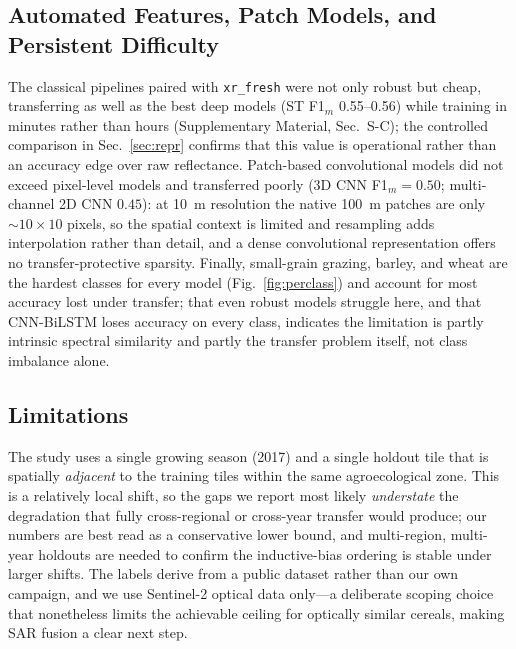 \documentclass[journal]{IEEEtran}
\begin{document}
\subsection{Automated Features, Patch Models, and Persistent Difficulty}
The classical pipelines paired with \texttt{xr\_fresh} were not only robust but cheap, transferring as well as the best deep models (ST F1$_m$ 0.55--0.56) while training in minutes rather than hours (Supplementary Material, Sec.~S-C); the controlled comparison in Sec.~\ref{sec:repr} confirms that this value is operational rather than an accuracy edge over raw reflectance. Patch-based convolutional models did not exceed pixel-level models and transferred poorly (3D CNN F1$_m=0.50$; multi-channel 2D CNN $0.45$): at 10~m resolution the native 100~m patches are only ${\sim}10\times10$ pixels, so the spatial context is limited and resampling adds interpolation rather than detail, and a dense convolutional representation offers no transfer-protective sparsity. Finally, small-grain grazing, barley, and wheat are the hardest classes for every model (Fig.~\ref{fig:perclass}) and account for most accuracy lost under transfer; that even robust models struggle here, and that CNN-BiLSTM loses accuracy on every class, indicates the limitation is partly intrinsic spectral similarity and partly the transfer problem itself, not class imbalance alone.

\subsection{Limitations}
The study uses a single growing season (2017) and a single holdout tile that is spatially \emph{adjacent} to the training tiles within the same agroecological zone. This is a relatively local shift, so the gaps we report most likely \emph{understate} the degradation that fully cross-regional or cross-year transfer would produce; our numbers are best read as a conservative lower bound, and multi-region, multi-year holdouts are needed to confirm the inductive-bias ordering is stable under larger shifts. The labels derive from a public dataset rather than our own campaign, and we use Sentinel-2 optical data only---a deliberate scoping choice that nonetheless limits the achievable ceiling for optically similar cereals, making SAR fusion a clear next step.
\end{document}
